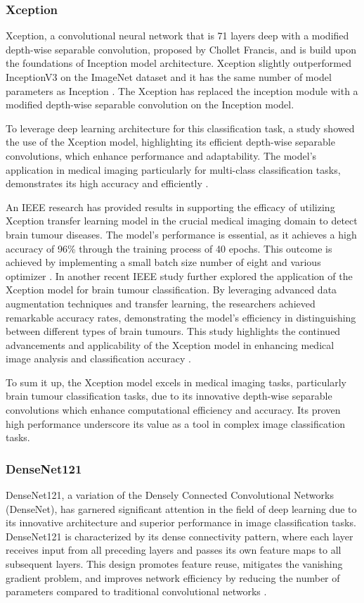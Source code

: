 \subsubsection{Xception}
Xception, a convolutional neural network that is 71 layers deep with a modified depth-wise separable convolution, proposed by Chollet Francis, and is build upon the foundations of Inception model architecture. Xception slightly outperformed InceptionV3 on the ImageNet dataset and it has the same number of model parameters as Inception \cite{Francois_Chollet}. The Xception has replaced the inception module with a modified depth-wise separable convolution on the Inception model.

To leverage deep learning architecture for this classification task, a study showed the use of the Xception model, highlighting its efficient depth-wise separable convolutions, which enhance performance and adaptability. The model's application in medical imaging particularly for multi-class classification tasks, demonstrates its high accuracy and efficiently \cite{li2024leveraging}.

An IEEE research has provided results in supporting the efficacy of utilizing Xception transfer learning model in the crucial medical imaging domain to detect brain tumour diseases. The model's performance is essential, as it achieves a high accuracy of 96\% through the training process of 40 epochs. This outcome is achieved by implementing a small batch size number of eight and various optimizer \cite{10511504}. In another recent IEEE study further explored the application of the Xception model for brain tumour classification. By leveraging advanced data augmentation techniques and transfer learning, the researchers achieved remarkable accuracy rates, demonstrating the model's efficiency in distinguishing between different types of brain tumours. This study highlights the continued advancements and applicability of the Xception model in enhancing medical image analysis and classification accuracy \cite{10331713}.

To sum it up, the Xception model excels in medical imaging tasks, particularly brain tumour classification tasks, due to its innovative depth-wise separable convolutions which enhance computational efficiency and accuracy. Its proven high performance underscore its value as a tool in complex image classification tasks.

\subsubsection{DenseNet121}
DenseNet121, a variation of the Densely Connected Convolutional Networks (DenseNet)\cite{DenseNet121_2017}, has garnered significant attention in the field of deep learning due to its innovative architecture and superior performance in image classification tasks. DenseNet121 is characterized by its dense connectivity pattern, where each layer receives input from all preceding layers and passes its own feature maps to all subsequent layers. This design promotes feature reuse, mitigates the vanishing gradient problem, and improves network efficiency by reducing the number of parameters compared to traditional convolutional networks .

